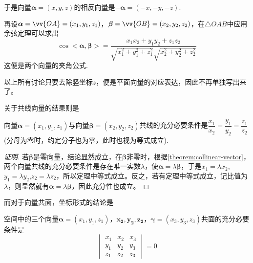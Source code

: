 于是向量$\bm{\alpha}=(x,y,z)$的相反向量是$-\bm{\alpha}=(-x,-y,-z)$.

再设$\bm{\alpha}=\vv{OA}=(x_1,y_1,z_1)$，$\bm{\beta}=\vv{OB}=(x_2,y_2,z_2)$，在$\triangle OAB$中应用余弦定理可以求出
\[ \cos{<\bm{\alpha},\bm{\beta}>} = \frac{x_1x_2+y_1y_2+z_1z_2}{\sqrt{x_1^2+y_1^2+z_1^2} \sqrt{x_2^2+y_2^2+z_2^2}} \]
这便是两个向量的夹角公式.

以上所有讨论只要去除竖坐标$z$，便是平面向量的对应表达，因此不再单独写出来了。

关于共线向量的结果则是
\begin{theorem}
  \label{theorem:collinear-vector-codrnation}
  向量$\bm{\alpha}=(x_1,y_1,z_1)$与向量$\bm{\beta}=(x_2,y_2,z_2)$共线的充分必要条件是$\dfrac{x_1}{x_2}=\dfrac{y_1}{y_2}=\dfrac{z_1}{z_2}$(分母为零时，约定分子也为零，此时也视为等式成立).
\end{theorem}

\begin{proof}[证明]
 若$\bm{\beta}$是零向量，结论显然成立，在$\bm{\beta}$非零时，根据\autoref{theorem:collinear-vector}，两个向量共线的充分必要条件是存在唯一实数$\lambda$，使$\bm{\alpha} = \lambda \bm{\beta}$，于是$x_1=\lambda x_2$,$y_1 = \lambda y_2$,$z_2=\lambda z_2$，所以定理中等式成立。反之，若有定理中等式成立，记比值为$\lambda$，则显然就有$\bm{\alpha}=\lambda \bm{\beta}$，因此充分性也成立。
\end{proof}

而对于向量共面，坐标形式的结论是
\begin{theorem}
  \label{theorem:coplanear-vector-cordination}
  空间中的三个向量$\bm{\alpha}=(x_1,y_1,z_1)$，$\bm{x_2,y_2,z_2}$，$\bm{\gamma}=(x_3,y_3,z_3)$共面的充分必要条件是
\[
  \begin{vmatrix}
    x_1 & x_2 & x_3\\
    y_1 & y_2 & y_3 \\
    z_1 & z_2 & z_3 
  \end{vmatrix}
  = 0
\]
\end{theorem}

